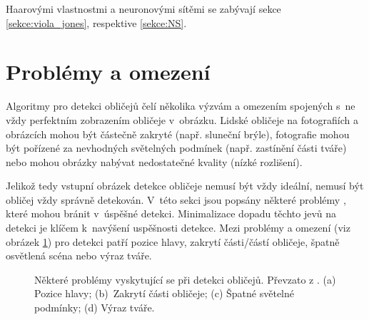 Haarovými vlastnostmi a neuronovými sítěmi se zabývají sekce \ref{sekce:viola_jones}, respektive \ref{sekce:NS}.

\section{Problémy a omezení}
\label{sekce:problemy}
Algoritmy pro detekci obličejů čelí několika výzvám a omezením spojených s~ne vždy perfektním zobrazením obličeje v~obrázku. Lidské obličeje na fotografiích a obrázcích mohou být částečně zakryté (např. sluneční brýle), fotografie mohou být pořízené za nevhodných světelných podmínek (např. zastínění části tváře) nebo mohou obrázky nabývat nedostatečné kvality (nízké rozlišení).

Jelikož tedy vstupní obrázek detekce obličeje nemusí být vždy ideální, nemusí být obličej vždy správně detekován.
V~této sekci jsou popsány některé problémy \cite{feature-based-fd-review, fdReview}, které mohou bránit v~úspěšné detekci. Minimalizace dopadu těchto jevů na detekci je klíčem k~navýšení uspěšnosti detekce. Mezi problémy a omezení (viz obrázek \ref{fdproblems}) pro detekci patří pozice hlavy, zakrytí části/částí obličeje, špatně osvětlená scéna nebo výraz tváře.

\begin{figure}[H]
  \begin{center}
  \label{fdproblems}
  \caption{Některé problémy vyskytující se při detekci obličejů. Převzato z \cite{frReview}. (a) Pozice hlavy; (b)~Zakrytí části obličeje; (c) Špatné světelné podmínky; (d) Výraz tváře.}
  \end{center}
\end{figure}

